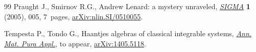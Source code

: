 \documentclass[pdftex]{sigma}%
\numberwithin{equation}{section}
\begin{document}
\begin{thebibliography}{99}
Praught J., Smirnov R.G., Andrew {L}enard: a mystery unraveled, \href{https://doi.org/10.3842/SIGMA.2005.005}{\textit{SIGMA}}
 \textbf{1} (2005), 005, 7~pages, \href{https://arxiv.org/abs/nlin.SI/0510055}{arXiv:nlin.SI/0510055}.

Tempesta P., Tondo G., Haantjes algebras of classical integrable systems,
 \href{https://doi.org/10.1007/s10231-021-01107-4}{\textit{Ann. Mat. Pura Appl.}}, {t}o appear, \href{https://arxiv.org/abs/1405.5118}{arXiv:1405.5118}.

\end{thebibliography}\LastPageEnding
\end{document}
